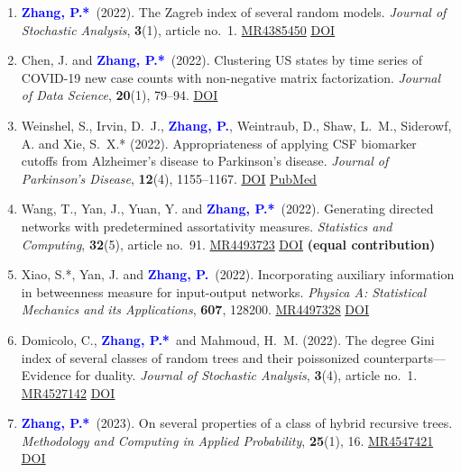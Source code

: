 \documentclass[12pt]{article}
\def\MR#1{\href{http://www.ams.org/mathscinet-getitem?mr=#1}{MR#1}}
\newcommand{\PZ}{\textcolor{blue}{\textbf{Zhang, P.*}}}
\newcommand{\PZnot}{\textcolor{blue}{\textbf{Zhang, P.}}}
\begin{document}
\begin{enumerate}
		\item \PZ\ (2022). The Zagreb index of several random models. {\em Journal of Stochastic Analysis}, {\bf 3}(1), article no.\ 1. \MR{4385450}
		\href{https://doi.org/10.31390/josa.3.1.01}{\underline{DOI}}
		
		\item {\sc Chen, J.} and \PZ\ (2022). Clustering US states by time series of COVID-19 new case counts with non-negative matrix	factorization. {\em Journal of Data Science}, {\bf 20}(1), 79--94.
		\href{https://doi.org/10.6339/22-JDS1036}{\underline{DOI}}
		
		\item {\sc Weinshel, S., Irvin, D.\ J.,} \PZnot, {\sc Weintraub, D., Shaw, L.\ M., Siderowf, A. and Xie, S.\ X.*} (2022). Appropriateness of applying CSF biomarker cutoffs from Alzheimer’s disease to Parkinson’s disease. {\em Journal of Parkinson's Disease}, {\bf 12}(4), 1155--1167. 
		\href{https://doi.org/10.3233/JPD-212989}{\underline{DOI}} 
		\href{https://pubmed.ncbi.nlm.nih.gov/35431261}
		{\underline{PubMed}}
		
		\item {\sc Wang, T., Yan, J., Yuan, Y.} and \PZ\ (2022). 
		Generating directed networks with predetermined 
		assortativity measures. {\em Statistics and Computing}, {\bf 
		32}(5), article no.\ 91. \MR{4493723}
		\href{https://doi.org/10.1007/s11222-022-10161-8}{\underline{DOI}} {\bf (equal contribution)}
		
		\item {\sc Xiao, S.*, Yan, J.} and \PZnot\ (2022). 
		Incorporating auxiliary information in betweenness measure 
		for	input-output networks. {\em Physica A: Statistical 
		Mechanics and its Applications}, {\bf 607}, 128200. 
		\MR{4497328} 
		\href{https://doi.org/10.1016/j.physa.2022.128200}{\underline{DOI}}
		
		\item {\sc Domicolo, C.,} \PZ\ and Mahmoud, H.\ M. (2022). 
		The degree Gini index of several classes of random trees and 
		their poissonized counterparts---Evidence for duality. {\em 
		Journal of Stochastic Analysis}, {\bf 3}(4), article no.\ 
		1. \MR{4527142}
		\href{https://doi.org/10.31390/josa.3.4.01}{\underline{DOI}}
						
		\item \PZ\ (2023). On several properties of a class of 
		hybrid recursive trees. {\em Methodology and Computing in 
		Applied Probability}, {\bf 25}(1), 16. \MR{4547421} 
		\href{https://doi.org/10.1007/s11009-023-09988-z}{\underline{DOI}}
	

\end{enumerate}
\end{document}
